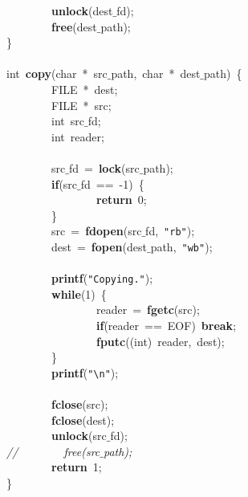 \mbox{}\ \ \ \ \ \ \ \ \textbf{unlock}(dest$\_$fd); \\
\mbox{}\ \ \ \ \ \ \ \ \textbf{free}(dest$\_$path); \\
\mbox{}\} \\
\mbox{} \\
\mbox{}int\ \textbf{copy}(char\ *\ src$\_$path,\ char\ *\ dest$\_$path)\ \{ \\
\mbox{}\ \ \ \ \ \ \ \ FILE\ *\ dest; \\
\mbox{}\ \ \ \ \ \ \ \ FILE\ *\ src; \\
\mbox{}\ \ \ \ \ \ \ \ int\ src$\_$fd; \\
\mbox{}\ \ \ \ \ \ \ \ int\ reader; \\
\mbox{} \\
\mbox{}\ \ \ \ \ \ \ \ src$\_$fd\ =\ \textbf{lock}(src$\_$path); \\
\mbox{}\ \ \ \ \ \ \ \ \textbf{if}(src$\_$fd\ ==\ -1)\ \{ \\
\mbox{}\ \ \ \ \ \ \ \ \ \ \ \ \ \ \ \ \textbf{return}\ 0; \\
\mbox{}\ \ \ \ \ \ \ \ \} \\
\mbox{}\ \ \ \ \ \ \ \ src\ =\ \textbf{fdopen}(src$\_$fd,\ \texttt{"{}rb"{}}); \\
\mbox{}\ \ \ \ \ \ \ \ dest\ =\ \textbf{fopen}(dest$\_$path,\ \texttt{"{}wb"{}}); \\
\mbox{}\ \ \ \ \ \ \ \  \\
\mbox{}\ \ \ \ \ \ \ \ \textbf{printf}(\texttt{"{}Copying."{}}); \\
\mbox{}\ \ \ \ \ \ \ \ \textbf{while}(1)\ \{ \\
\mbox{}\ \ \ \ \ \ \ \ \ \ \ \ \ \ \ \ reader\ =\ \textbf{fgetc}(src); \\
\mbox{}\ \ \ \ \ \ \ \ \ \ \ \ \ \ \ \ \textbf{if}(reader\ ==\ EOF)\ \textbf{break}; \\
\mbox{}\ \ \ \ \ \ \ \ \ \ \ \ \ \ \ \ \textbf{fputc}((int)\ reader,\ dest); \\
\mbox{}\ \ \ \ \ \ \ \ \} \\
\mbox{}\ \ \ \ \ \ \ \ \textbf{printf}(\texttt{"{}}\texttt{\textbackslash{}n}\texttt{"{}}); \\
\mbox{} \\
\mbox{}\ \ \ \ \ \ \ \ \textbf{fclose}(src); \\
\mbox{}\ \ \ \ \ \ \ \ \textbf{fclose}(dest); \\
\mbox{}\ \ \ \ \ \ \ \ \textbf{unlock}(src$\_$fd); \\
\mbox{}\textit{//\ \ \ \ \ \ \ \ free(src$\_$path);} \\
\mbox{}\ \ \ \ \ \ \ \ \textbf{return}\ 1; \\
\mbox{}\} \\

